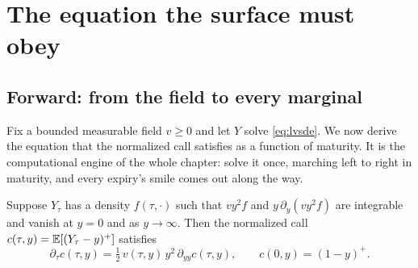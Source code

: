 \section{The equation the surface must obey}
\label{sec:lveq}

\subsection{Forward: from the field to every marginal}

Fix a bounded measurable field $v\ge0$ and let $Y$ solve
\eqref{eq:lvsde}.  We now derive the equation that the normalized call
satisfies as a function of maturity.  It is the computational engine of
the whole chapter: solve it once, marching left to right in maturity,
and every expiry's smile comes out along the way.

\begin{proposition}
\label{prop:lvforward}
Suppose $Y_\tau$ has a density $f(\tau,\cdot)$ such that
$v y^{2}f$ and $y\,\partial_y(v y^{2}f)$ are integrable and vanish at
$y=0$ and as $y\to\infty$.
Then the normalized call $c(\tau,y)=\mathbb{E}[(Y_\tau-y)^+]$ satisfies
\begin{equation}
\boxed{\;\partial_\tau c(\tau,y)
=\tfrac12\,v(\tau,y)\,y^{2}\,\partial_{yy}c(\tau,y),
\qquad c(0,y)=(1-y)^{+}.\;}
\label{eq:lvdupire}
\end{equation}
\end{proposition}

